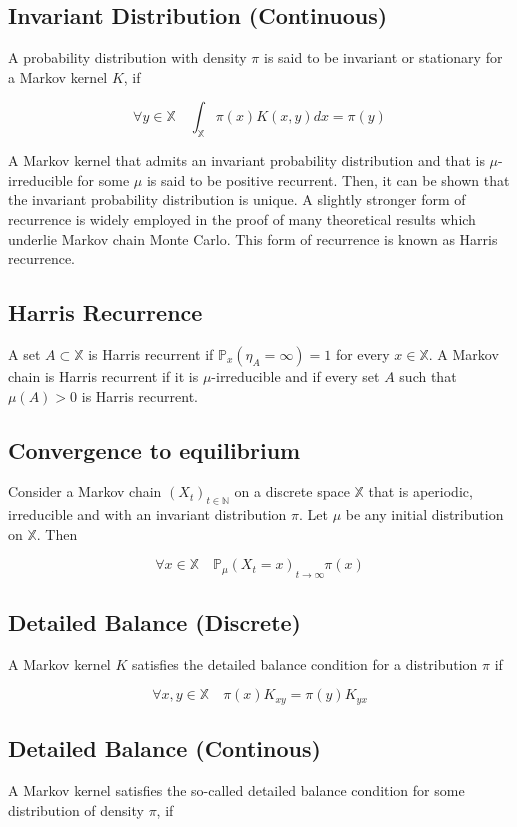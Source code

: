 \documentclass[10pt]{article}
\begin{document}
\subsection{Invariant Distribution (Continuous)}
 A probability distribution with density $\pi$ is said to be invariant or stationary for a Markov kernel $K$, if

$$
\forall y \in \mathbb{X} \quad \int_{\mathbb{X}} \pi(x) K(x, y) d x=\pi(y)
$$

A Markov kernel that admits an invariant probability distribution and that is $\mu$-irreducible for some $\mu$ is said to be positive recurrent. Then, it can be shown that the invariant probability distribution is unique. A slightly stronger form of recurrence is widely employed in the proof of many theoretical results which underlie Markov chain Monte Carlo. This form of recurrence is known as Harris recurrence.

 \subsection{Harris Recurrence}
 A set $A \subset \mathbb{X}$ is Harris recurrent if $\mathbb{P}_{x}\left(\eta_{A}=\infty\right)=1$ for every $x \in \mathbb{X}$. A Markov chain is Harris recurrent if it is $\mu$-irreducible and if every set $A$ such that $\mu(A)>0$ is Harris recurrent.

 
\subsection{Convergence to equilibrium}
Consider a Markov chain $\left(X_{t}\right)_{t \in \mathbb{N}}$ on a discrete space $\mathbb{X}$ that is aperiodic, irreducible and with an invariant distribution $\pi$. Let $\mu$ be any initial distribution on $\mathbb{X}$. Then

$$
\forall x \in \mathbb{X} \quad \mathbb{P}_{\mu}\left(X_{t}=x\right) \underset{t \rightarrow \infty}{ } \pi(x)
$$

\subsection{Detailed Balance (Discrete)}
A Markov kernel $K$ satisfies the detailed balance condition for a distribution $\pi$ if

$$
\forall x, y \in \mathbb{X} \quad \pi(x) K_{x y}=\pi(y) K_{y x}
$$
\subsection{Detailed Balance (Continous)}
A Markov kernel satisfies the so-called detailed balance condition for some distribution of density $\pi$, if
\end{document}
